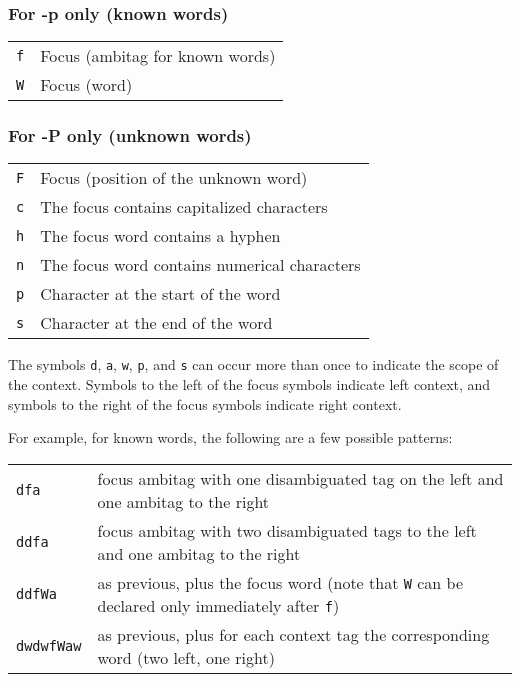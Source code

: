 \documentclass{report}
\begin{document}
\subsubsection*{For -p only (known words)}

\begin{tabular}{ll}
{\tt f} & Focus (ambitag for known words)\\
{\tt W} & Focus (word)\\
\end{tabular}

\subsubsection{For -P only (unknown words)}

\begin{tabular}{ll}
{\tt F} & Focus (position of the unknown word) \\
{\tt c} & The focus contains capitalized characters \\
{\tt h} & The focus word contains a hyphen\\
{\tt n} & The focus word contains numerical characters \\
{\tt p} & Character at the start of the word \\
{\tt s} & Character at the end of the word \\
\end{tabular}

The symbols {\tt d}, {\tt a}, {\tt w}, {\tt p}, and {\tt s} can occur
more than once to indicate the scope of the context. Symbols to the
left of the focus symbols indicate left context, and symbols to the
right of the focus symbols indicate right context.

For example, for known words, the following are a few possible patterns: 

\begin{tabular}{ll}
{\tt dfa}  & focus ambitag with one disambiguated tag on the left and one ambitag to the right \\
{\tt ddfa} & focus ambitag with two disambiguated tags to the left and one ambitag to the right \\ 
{\tt ddfWa} & as previous, plus the focus word (note that {\tt W} can be declared only immediately after {\tt f}) \\
{\tt dwdwfWaw} & as previous, plus for each context tag the corresponding word (two left, one right)\\ 
\end{tabular}
\end{document}
